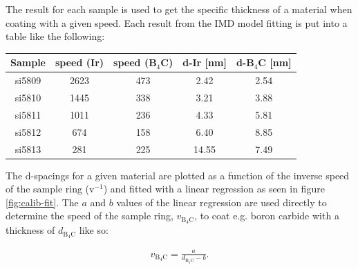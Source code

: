 The result for each sample is used to get the specific thickness of a material when coating with a given speed. Each result from the IMD model fitting is put into a table like the following:

\begin{center}
\begin{tabular}{c|c|c|c|c}
Sample & speed (Ir) & speed (B$_4$C) & d-Ir [nm] & d-B$_4$C [nm] \\
\hline
si5809 & 2623 & 473 & 2.42 & 2.54 \\
si5810 & 1445 & 338 & 3.21 & 3.88 \\
si5811 & 1011 & 236 & 4.33 & 5.81 \\
si5812 &  674 & 158 & 6.40 & 8.85 \\
si5813 & 281 & 225 & 14.55 & 7.49
\end{tabular}
\end{center}

The d-spacings for a given material are plotted as a function of the inverse speed of the sample ring (v$^{-1}$) and fitted with a linear regression as seen in figure \ref{fig:calib-fit}. The $a$ and $b$ values of the linear regression are used directly to determine the speed of the sample ring, $v_{\mathrm{B}_4\mathrm{C}}$, to coat e.g. boron carbide with a thickness of $d_{\mathrm{B}_4\mathrm{C}}$ like so:

\begin{eqnarray}
	v_{\mathrm{B}_4\mathrm{C}} = \frac{a}{d_{\mathrm{B}_4\mathrm{C}}-b}.
\end{eqnarray}

